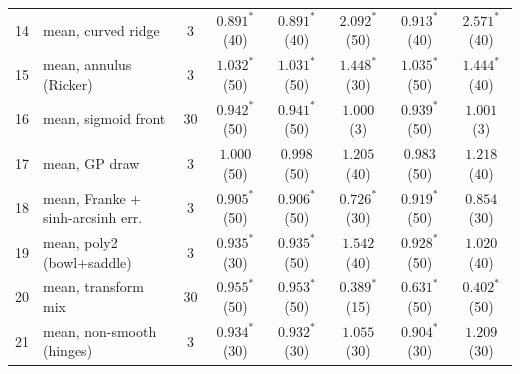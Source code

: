 \begin{tabular}{clcccccc}
14 & mean, curved ridge & 3 & $0.891^{*}$ {\tiny(40)} & $0.891^{*}$ {\tiny(40)} & $2.092^{*}$ {\tiny(50)} & $0.913^{*}$ {\tiny(40)} & $2.571^{*}$ {\tiny(40)} \\
15 & mean, annulus (Ricker) & 3 & $1.032^{*}$ {\tiny(50)} & $1.031^{*}$ {\tiny(50)} & $1.448^{*}$ {\tiny(30)} & $1.035^{*}$ {\tiny(50)} & $1.444^{*}$ {\tiny(40)} \\
16 & mean, sigmoid front & 30 & $0.942^{*}$ {\tiny(50)} & $0.941^{*}$ {\tiny(50)} & $1.000$ {\tiny(3)} & $0.939^{*}$ {\tiny(50)} & $1.001$ {\tiny(3)} \\
17 & mean, GP draw & 3 & $1.000$ {\tiny(50)} & $0.998$ {\tiny(50)} & $1.205$ {\tiny(40)} & $0.983$ {\tiny(50)} & $1.218$ {\tiny(40)} \\
18 & mean, Franke + sinh-arcsinh err. & 3 & $0.905^{*}$ {\tiny(50)} & $0.906^{*}$ {\tiny(50)} & $\mathbf{0.726^{*}}$ {\tiny(30)} & $0.919^{*}$ {\tiny(50)} & $0.854$ {\tiny(30)} \\
19 & mean, poly2 (bowl+saddle) & 3 & $0.935^{*}$ {\tiny(30)} & $0.935^{*}$ {\tiny(50)} & $1.542$ {\tiny(40)} & $0.928^{*}$ {\tiny(50)} & $1.020$ {\tiny(40)} \\
20 & mean, transform mix & 30 & $0.955^{*}$ {\tiny(50)} & $0.953^{*}$ {\tiny(50)} & $\mathbf{0.389^{*}}$ {\tiny(15)} & $\mathbf{0.631^{*}}$ {\tiny(50)} & $\mathbf{0.402^{*}}$ {\tiny(50)} \\
21 & mean, non-smooth (hinges) & 3 & $0.934^{*}$ {\tiny(30)} & $0.932^{*}$ {\tiny(30)} & $1.055$ {\tiny(30)} & $0.904^{*}$ {\tiny(30)} & $1.209$ {\tiny(30)} \\
\bottomrule
\end{tabular}
